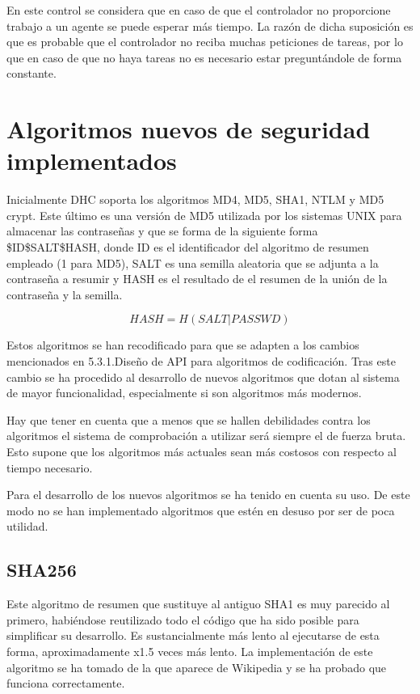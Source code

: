 En este control se considera que en caso de que el controlador no proporcione trabajo a un agente se puede esperar más tiempo. La razón de dicha suposición es que es probable que el controlador no reciba muchas peticiones de tareas, por lo que en caso de que no haya tareas no es necesario estar preguntándole de forma constante.

\section{Algoritmos nuevos de seguridad implementados}

Inicialmente DHC soporta los algoritmos MD4, MD5, SHA1, NTLM y MD5 crypt. Este último es una versión de MD5 utilizada por los sistemas UNIX para almacenar las contraseñas y que se forma de la siguiente forma \$ID\$SALT\$HASH, donde ID es el identificador del algoritmo de resumen empleado (1 para MD5), SALT es una semilla aleatoria que se adjunta a la contraseña a resumir y HASH es el resultado de el resumen de la unión de la contraseña y la semilla.

$$HASH = H(SALT | PASSWD)$$

Estos algoritmos se han recodificado para que se adapten a los cambios mencionados en 5.3.1.Diseño de API para algoritmos de codificación. Tras este cambio se ha procedido al desarrollo de nuevos algoritmos que dotan al sistema de mayor funcionalidad, especialmente si son algoritmos más modernos.

Hay que tener en cuenta que a menos que se hallen debilidades contra los algoritmos el sistema de comprobación a utilizar será siempre el de fuerza bruta. Esto supone que los algoritmos más actuales sean más costosos con respecto al tiempo necesario.

Para el desarrollo de los nuevos algoritmos se ha tenido en cuenta su uso. De este modo no se han implementado algoritmos que estén en desuso por ser de poca utilidad.

\subsection{SHA256}

Este algoritmo de resumen que sustituye al antiguo SHA1 es muy parecido al primero, habiéndose reutilizado todo el código que ha sido posible para simplificar su desarrollo. Es sustancialmente más lento al ejecutarse de esta forma, aproximadamente x1.5 veces más lento.
La implementación de este algoritmo se ha tomado de la que aparece de Wikipedia y se ha probado que funciona correctamente.
